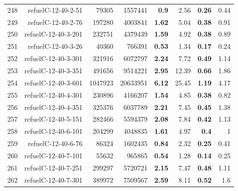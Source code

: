 \begin{longtable}{lrr@{\hskip 12pt}r@{\hskip 12pt}r@{\hskip 12pt}r@{\hskip 12pt}r@{\hskip 12pt}r}
248 & \multirow{1}{*}{refuelC-12-40-2-51} & \multirow{1}{*}{79305} & \multirow{1}{*}{1557441} & \textbf{0.9} & 2.56 & \textbf{0.26} & 0.44 \\
249 & \multirow{1}{*}{refuelC-12-40-2-76} & \multirow{1}{*}{197280} & \multirow{1}{*}{4003841} & \textbf{1.62} & 5.04 & \textbf{0.38} & 0.91 \\
250 & \multirow{1}{*}{refuelC-12-40-3-201} & \multirow{1}{*}{232751} & \multirow{1}{*}{4379439} & \textbf{1.59} & 4.92 & \textbf{0.38} & 0.89 \\
251 & \multirow{1}{*}{refuelC-12-40-3-26} & \multirow{1}{*}{40360} & \multirow{1}{*}{766391} & \textbf{0.53} & 1.34 & \textbf{0.17} & 0.24 \\
252 & \multirow{1}{*}{refuelC-12-40-3-301} & \multirow{1}{*}{321916} & \multirow{1}{*}{6072797} & \textbf{2.24} & 7.72 & \textbf{0.49} & 1.14 \\
253 & \multirow{1}{*}{refuelC-12-40-3-351} & \multirow{1}{*}{491656} & \multirow{1}{*}{9514221} & \textbf{2.95} & 12.39 & \textbf{0.66} & 1.86 \\
254 & \multirow{1}{*}{refuelC-12-40-3-601} & \multirow{1}{*}{1047923} & \multirow{1}{*}{20633951} & \textbf{6.12} & 25.45 & \textbf{1.19} & 4.17 \\
255 & \multirow{1}{*}{refuelC-12-40-4-301} & \multirow{1}{*}{230896} & \multirow{1}{*}{4166207} & \textbf{1.54} & 4.85 & \textbf{0.38} & 0.82 \\
256 & \multirow{1}{*}{refuelC-12-40-4-351} & \multirow{1}{*}{325376} & \multirow{1}{*}{6037789} & \textbf{2.21} & 7.45 & \textbf{0.45} & 1.38 \\
257 & \multirow{1}{*}{refuelC-12-40-5-151} & \multirow{1}{*}{282466} & \multirow{1}{*}{5594379} & \textbf{2.08} & 7.84 & \textbf{0.42} & 1.13 \\
258 & \multirow{1}{*}{refuelC-12-40-6-101} & \multirow{1}{*}{204299} & \multirow{1}{*}{4048835} & \textbf{1.61} & 4.97 & \textbf{0.4} & 1 \\
259 & \multirow{1}{*}{refuelC-12-40-6-76} & \multirow{1}{*}{86324} & \multirow{1}{*}{1602435} & \textbf{0.84} & 2.32 & \textbf{0.25} & 0.41 \\
260 & \multirow{1}{*}{refuelC-12-40-7-101} & \multirow{1}{*}{55632} & \multirow{1}{*}{965865} & \textbf{0.54} & 1.28 & \textbf{0.14} & 0.25 \\
261 & \multirow{1}{*}{refuelC-12-40-7-251} & \multirow{1}{*}{299297} & \multirow{1}{*}{5720721} & \textbf{2.15} & 7.47 & \textbf{0.48} & 1.11 \\
262 & \multirow{1}{*}{refuelC-12-40-7-301} & \multirow{1}{*}{389972} & \multirow{1}{*}{7509567} & \textbf{2.59} & 8.11 & \textbf{0.52} & 1.6 \\

\end{longtable}
